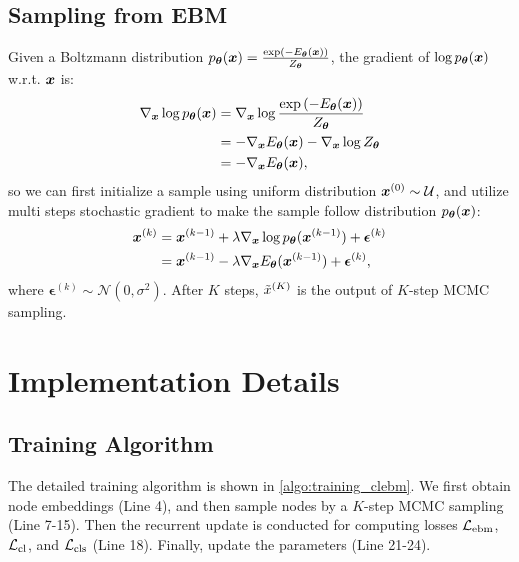 \subsection{Sampling from EBM}
\label{sec:sgld}
Given a Boltzmann distribution $p_{{\bm{\theta}}}({\bm{x}}) = \frac{\exp (-E_{{\bm{\theta}}}({\bm{x}}))}{Z_{{\bm{\theta}}}}$, the gradient of $\log p_{\bm{\theta}}({\bm{x}})$ w.r.t. ${\bm{x}}$ is:
\begin{equation*}
\begin{aligned}
    \nabla_{\bm{x}} \log p_{\bm{\theta}}({\bm{x}})
    &= \nabla_{\bm{x}} \log \frac{\exp{(-E_{\bm{\theta}}({\bm{x}}))}}{Z_{\bm{\theta}}} \\
    &= -\nabla_{\bm{x}} E_{\bm{\theta}}({\bm{x}}) - \nabla_{\bm{x}} \log Z_{\bm{\theta}} \\
    &= -\nabla_{\bm{x}} E_{\bm{\theta}}({\bm{x}}), 
\end{aligned}
\end{equation*}
so we can first initialize a sample using uniform distribution ${\bm{x}}^{(0)} \sim \mathcal{U}$, 
and utilize multi steps stochastic gradient to make the sample follow distribution $p_{\bm{\theta}} ({\bm{x}})$:
\begin{equation*}
\begin{aligned}
    {\bm{x}}^{(k)} 
    &= {\bm{x}}^{(k-1)}+\lambda \nabla_{\bm{x}} \log p_{\bm{\theta}}({\bm{x}}^{(k-1)}) + \bm{\epsilon}^{(k)} \\
    &= {\bm{x}}^{(k-1)}-\lambda \nabla_{\bm{x}} E_{\bm{\theta}}({\bm{x}}^{(k-1)}) + \bm{\epsilon}^{(k)}, 
\end{aligned}
\end{equation*}
where $\bm{\epsilon}^{(k)} \sim \mathcal{N}(0, \sigma^2)$. After $K$ steps, $\Tilde{x}^{(K)}$ is the output of $K$-step MCMC sampling.



\section{Implementation Details}


\subsection{Training Algorithm}
\label{sec:training_clebm}
The detailed training algorithm is shown in \cref{algo:training_clebm}. 
We first obtain node embeddings (Line 4), and then sample nodes by a $K$-step MCMC sampling (Line 7-15). 
Then the recurrent update is conducted for computing losses $\mathcal{L}_{\text{ebm}}$, $\mathcal{L}_{\text{cl}}$, and $\mathcal{L}_{\text{cls}}$ (Line 18). 
Finally, update the parameters (Line 21-24).


